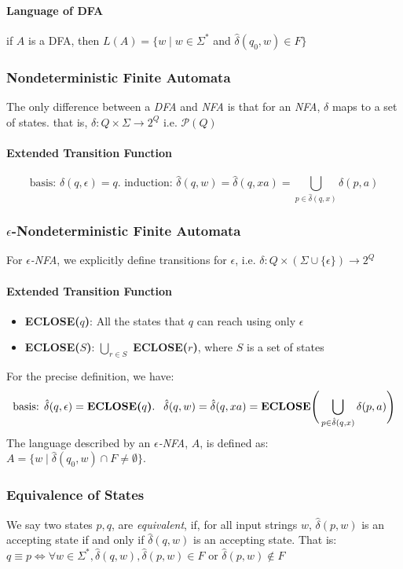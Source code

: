 \documentclass[20pt]{article} %
\begin{document}
\paragraph{Language of DFA} if $A$ is a DFA, then $L(A) = \{ w \mid w \in \Sigma^{*}$ and $\hat{\delta}(q_0, w) \in F \}$
\subsubsection{Nondeterministic Finite Automata}
The only difference between a \textit{DFA} and \textit{NFA} is that for an \textit{NFA}, $\delta$ maps to a set of states. that is, $\delta: Q \times \Sigma \rightarrow 2^{Q}$ i.e. $\mathcal{P}(Q)$
\paragraph{Extended Transition Function}
$$\text{basis: } \hat{\delta}(q, \epsilon) = q. \text{  induction: } \hat{\delta}(q,w) = \hat{\delta}(q, xa) = \bigcup_{p \in \hat{\delta}(q,x)}\delta(p,a)$$
\subsubsection{$\epsilon$-Nondeterministic Finite Automata}
For $\epsilon$\textit{-NFA}, we explicitly define transitions for $\epsilon$, i.e. $\delta: Q \times (\Sigma \cup \{ \epsilon \}) \rightarrow 2^{Q}$
\paragraph{Extended Transition Function}
\begin{itemize}
\item \textbf{ECLOSE($q$)}: All the states that $q$ can reach using only $\epsilon$
\item \textbf{ECLOSE($S$)}: $\bigcup_{r \in S}$ \textbf{ECLOSE($r$)}, where $S$ is a set of states
\end{itemize}
For the precise definition, we have: 
$$\text{basis: } \hat{\delta}(q, \epsilon) = \text{\textbf{ECLOSE($q$)}. } \ \hat{\delta}(q,w) = \hat{\delta}(q, xa) = \text{\textbf{ECLOSE}} \Bigg( \bigcup_{p \in \hat{\delta}(q,x)}\delta(p,a) \Bigg)$$
The language described by an $\epsilon$\textit{-NFA}, $A$, is defined as: $A = \{ w \mid \hat{\delta}(q_0, w) \cap F \neq \emptyset \}$.
\subsubsection{Equivalence of States}
We say two states $p,q$, are \textit{equivalent}, if, for all input strings $w$, $\hat{\delta}(p,w)$ is an accepting state if and only if $\hat{\delta}(q,w)$ is an accepting state. That is: \\
$q \equiv p \Leftrightarrow \forall w \in \Sigma^{*}, \hat{\delta}(q,w), \hat{\delta}(p,w) \in F$ or $\hat{\delta}(p,w) \notin F$
\end{document}
